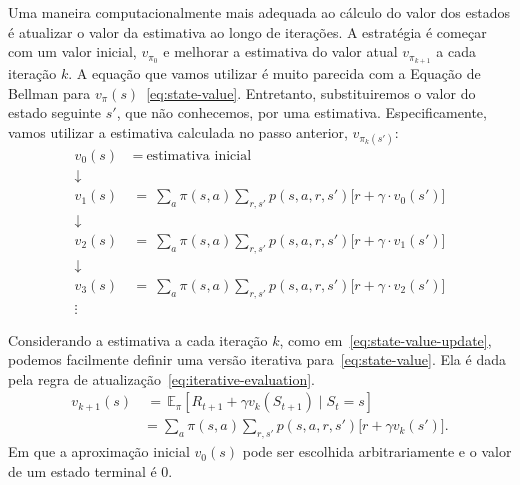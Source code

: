 \documentclass{article}
\begin{document}
            Uma maneira computacionalmente mais adequada ao cálculo do valor dos estados é atualizar o valor da estimativa ao longo de iterações. A estratégia é começar com um valor inicial, $v_{\pi_{0}}$ e melhorar a estimativa do valor atual $v_{\pi_{k+1}}$ a cada iteração $k$. A equação que vamos utilizar é muito parecida com a Equação de Bellman para $v_{\pi}(s)$~\eqref{eq:state-value}. Entretanto, substituiremos o valor  do estado seguinte $s'$, que não conhecemos, por uma estimativa. Especificamente, vamos utilizar a estimativa calculada no passo anterior, $v_{\pi_{k}(s')}$:
            \begin{equation}
            \label{eq:state-value-update}
            \begin{split}
                v_0(s) & \ = \ \text{estimativa inicial} \\
                \downarrow\\
                v_1(s) & \ = \ \sum_{a} \pi(s, a) \sum_{r, s'} p(s, a, r, s') \Big[ r + \gamma \cdot v_0(s') \Big]\\
                \downarrow\\
                v_2(s) & \ = \ \sum_{a} \pi(s, a) \sum_{r, s'} p(s, a, r, s') \Big[ r + \gamma \cdot v_1(s') \Big]\\
                \downarrow\\
                v_3(s) & \ = \ \sum_{a} \pi(s, a) \sum_{r, s'} p(s, a, r, s') \Big[ r + \gamma \cdot v_2(s') \Big]\\
                \vdots
            \end{split}
            \end{equation}
    
            Considerando a estimativa a cada iteração $k$, como em~\eqref{eq:state-value-update}, podemos facilmente definir uma versão iterativa para~\eqref{eq:state-value}. Ela é dada pela regra de atualização~\eqref{eq:iterative-evaluation}.
            \begin{equation}
                \begin{aligned}
                    v_{k+1}(s) & \ = \, \mathbb{E}_{\pi} \left[ R_{t+1} + \gamma v_k(S_{t+1}) \mid S_t = s \right] \\
                    & = \sum_a \pi(s, a) \sum_{r, s'} p(s, a, r, s') \Big[ r + \gamma v_k(s') \Big] .
                \end{aligned}
                \label{eq:iterative-evaluation}
            \end{equation} 
            Em que a aproximação inicial $v_0(s)$ pode ser escolhida arbitrariamente e o valor de um estado terminal é $0$.
\end{document}
